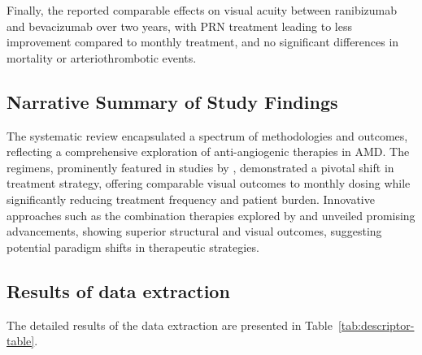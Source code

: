 Finally, the \citet{catt2012} reported comparable effects on visual acuity between ranibizumab and bevacizumab over two years, with PRN treatment leading to less improvement compared to monthly treatment, and no significant differences in mortality or arteriothrombotic events.

\subsection{Narrative Summary of Study Findings}\label{s:narrative-summary}
The systematic review encapsulated a spectrum of methodologies and outcomes, reflecting a comprehensive exploration of anti-angiogenic therapies in AMD. The \TreatAndExtend regimens, prominently featured in studies by \citet{kertes2019, kertes2020}, demonstrated a pivotal shift in treatment strategy, offering comparable visual outcomes to monthly dosing while significantly reducing treatment frequency and patient burden. Innovative approaches such as the combination therapies explored by \citet{russo2018} and \citet{semeraro2015} unveiled promising advancements, showing superior structural and visual outcomes, suggesting potential paradigm shifts in therapeutic strategies.

\subsection{Results of data extraction}\label{s:data-extraction-results}
The detailed results of the data extraction are presented in Table~\ref{tab:descriptor-table}.